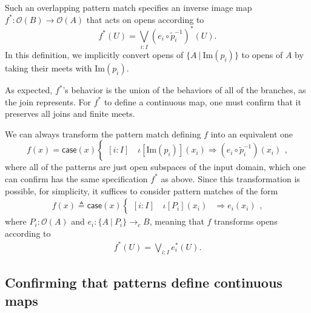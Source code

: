 \documentclass[conference]{IEEEtran}
\newcommand{\cto}{\to_c}
\newcommand{\suchthat}{\ |\ }
\newcommand{\Open}[1]{\mathcal{O}({#1})}
\newcommand{\Img}[1]{\text{Im}\left({#1}\right)}
\newcommand{\oinclf}[1]{\iota[{#1}]}
\newcommand{\oincl}[2]{\oinclf{#1} \left({#2}\right)}
\newcommand{\Branch}{\Rightarrow}
\newcommand{\iimg}[1]{#1^*}
\begin{document}
Such an overlapping pattern match specifies an inverse image map $\iimg{f} : \Open{B} \to \Open{A}$ that acts on opens according to
\[
\iimg{f}(U) = \bigvee_{i : I} \iimg{(e_i \circ \tilde{p}_i^{-1})}(U).
\]
In this definition, we implicitly convert opens of $\{ A \suchthat \Img{p_i} \}$ to opens of $A$ by taking their meets with $\Img{p_i}$.

As expected, $\iimg{f}$'s behavior is the union of the behaviors of all of the branches, as the join represents. For $\iimg{f}$ to define a continuous map, one must confirm that it preserves all joins and finite meets.

We can always transform the pattern match defining $f$ into an equivalent one
\[
f(x) = \mathsf{case}(x)
\begin{cases}
[i : I] \quad \oincl{\Img{p_i}}{x_i} \Branch (e_i \circ \tilde{p}_i^{-1})(x_i)
\end{cases},
\]
where all of the patterns are just open subspaces of the input domain, which one can confirm has the same specification $\iimg{f}$ as above. Since this transformation is possible, for simplicity, it suffices to consider pattern matches of the form
\begin{align}
\label{eq:pattern}
f(x) \triangleq \mathsf{case}(x)
\begin{cases}
[i : I] \quad \oincl{P_i}{x_i} &\Branch e_i(x_i)
\end{cases},
\end{align}
where $P_i : \Open{A}$ and $e_i : \{ A \suchthat P_i \} \cto B$, meaning that $f$ transforms opens according to
\begin{align}
\label{eq:iimg}
\iimg{f}(U) = \bigvee_{i : I} \iimg{e_i}(U).
\end{align}

\subsection{Confirming that patterns define continuous maps}
\end{document}
